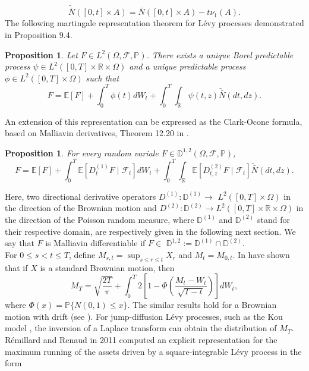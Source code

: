 \documentclass[11pt]{article}
\numberwithin{equation}{section}
\newtheorem{Proposition}[Theorem]{Proposition}
\begin{document}
$$
\tilde{\bar{N}}([0, t] \times A)=\bar{N}([0, t] \times A)-t \nu_1(A).
$$
The following martingale representation theorem for Lévy processes demonstrated in \cite{tankov} Proposition 9.4.

\begin{Proposition} 
Let $F \in L^{2}(\Omega, \mathcal{F}, \mathbb{P})$. There exists a unique Borel predictable process $\psi \in L^{2}([0, T] \times \mathbb{R} \times \Omega)$ and a unique predictable process $\phi \in L^{2}([0, T] \times \Omega)$ such that
\begin{equation*}
F=\mathbb{E}[F]+\int_{0}^{T} \phi(t) d W_{t}+\int_{0}^{T} \int_{\mathbb{R}} \psi(t, z) \tilde{\bar{N}}(d t, d z). \tag{1.2}
\end{equation*}
\end{Proposition}
An extension of this representation can be expressed as the Clark-Ocone formula, based on Malliavin derivatives, Theorem 12.20 in \cite{nunno}. 
\begin{Proposition} 
For every random variale $F \in \mathbb{D}^{1,2}(\Omega, \mathcal{F}, \mathbb{P})$,
$$
F=\mathbb{E}[F]+\int_{0}^{T} \mathbb{E}\left[D_{t}^{(1)} F \mid \mathcal{F}_{t}\right] d W_{t}+\int_{0}^{T} \int_{\mathbb{R}} \mathbb{E}\left[D_{t, z}^{(2)} F \mid \mathcal{F}_{t}\right] \widetilde{\bar{N}}(d t, d z).
$$
\end{Proposition}
Here, two directional derivative operators $D^{(1)}: \mathbb{D}^{(1)} \rightarrow$ $L^{2}([0, T] \times \Omega)$ in the direction of the Brownian motion and $D^{(2)}: \mathbb{D}^{(2)} \rightarrow L^{2}([0, T] \times \mathbb{R} \times \Omega)$ in the direction of the Poisson random measure, where $\mathbb{D}^{(1)}$ and $\mathbb{D}^{(2)}$ stand for their respective domain,  are respectively given in the following next section. 
We say that $F$ is Malliavin differentiable if $F \in$ $\mathbb{D}^{1,2}:=\mathbb{D}^{(1)} \cap \mathbb{D}^{(2)}$. \\
For $0 \leq s<t \leq T$, define $M_{s, t}=\sup _{s \leq r \leq t} X_{r}$ and $M_{t}=M_{0, t}$. 
In \cite{13} have shown that if $X$ is a standard Brownian motion, then
$$
M_{T}=\sqrt{\frac{2 T}{\pi}}+\int_{0}^{T} 2\left[1-\Phi\left(\frac{M_{t}-W_{t}}{\sqrt{T-t}}\right)\right] d W_{t},
$$
where $\Phi(x)=\mathbb{P}\{N(0,1) \leq x\}$.    
The similar results hold for a Brownian motion with drift (see \cite{11}). For jump-diffusion Lévy processes, such as the Kou model \cite{5}, the inversion of a Laplace transform can obtain the distribution of $M_{T}$. Rémillard and  Renaud in 2011 \cite{remillard} computed an explicit representation for the maximum running of the assets driven by a square-integrable Lévy process in the form 
\end{document}
